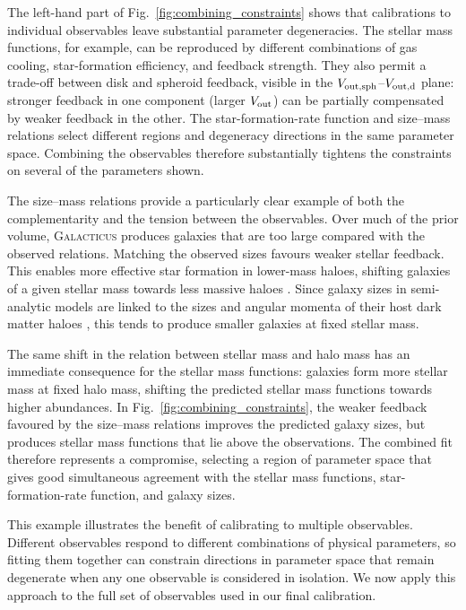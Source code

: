 \documentclass[twocolumn, apj, numberedappendix, iop]{openjournal}
\newcommand{\galacticus}{\textsc{Galacticus}\xspace}
\begin{document}
The left-hand part of Fig.~\ref{fig:combining_constraints} shows that
calibrations to individual observables leave substantial parameter
degeneracies. The stellar mass functions, for example, can be reproduced
by different combinations of gas cooling, star-formation efficiency, and
feedback strength. They also permit a trade-off between disk and spheroid
feedback, visible in the $V_{\rm out,sph}$--$V_{\rm out,d}$ plane: stronger
feedback in one component (larger $V_{\rm out}$) can be partially compensated
by weaker feedback in the other. The star-formation-rate function and
size--mass relations select different regions and degeneracy directions in
the same parameter space. Combining the observables therefore substantially
tightens the constraints on several of the parameters shown.

The size--mass relations provide a particularly clear example of both the
complementarity and the tension between the observables. Over much of the
prior volume, \galacticus{} produces galaxies that are too large compared
with the observed relations. Matching the observed sizes favours weaker
stellar feedback. This enables more effective star formation in lower-mass
haloes, shifting galaxies of a given stellar mass towards less massive haloes
\citep{2009MNRAS.397.1254G,2016MNRAS.462.3854L}. Since galaxy sizes in
semi-analytic models are linked to the sizes and angular momenta of their
host dark matter haloes \citep[e.g.][]{2000MNRAS.319..168C}, this tends to
produce smaller galaxies at fixed stellar mass.

The same shift in the relation between stellar mass and halo mass has
an immediate consequence for the stellar mass functions: galaxies form more
stellar mass at fixed halo mass, shifting the predicted stellar mass functions
towards higher abundances. In Fig.~\ref{fig:combining_constraints}, the weaker
feedback favoured by the size--mass relations improves the predicted galaxy
sizes, but produces stellar mass functions that lie above the observations.
The combined fit therefore represents a compromise, selecting a region of
parameter space that gives good simultaneous agreement with the stellar mass
functions, star-formation-rate function, and galaxy sizes.

This example illustrates the benefit of calibrating to multiple observables.
Different observables respond to different combinations of physical
parameters, so fitting them together can constrain directions in parameter
space that remain degenerate when any one observable is considered in
isolation. We now apply this approach to the full set of observables used in
our final calibration.
\end{document}
